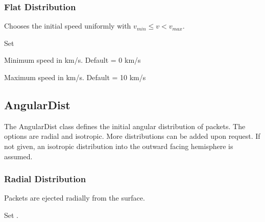 \documentclass[letterpaper,10pt,english]{sphinxmanual}
\begin{document}
\subsubsection{Flat Distribution}
\label{\detokenize{nexoclom2/inputfiles:flat-distribution}}\label{\detokenize{nexoclom2/inputfiles:flatspeeddist}}
\sphinxAtStartPar
Chooses the initial speed uniformly with \(v_{min} \leq v < v_{max}\).
\begin{description}
\sphinxAtStartPar
Set 

\sphinxAtStartPar
Minimum speed in km/s. Default = 0 km/s

\sphinxAtStartPar
Maximum speed in km/s. Default = 10 km/s

\end{description}


\subsection{AngularDist}
\label{\detokenize{nexoclom2/inputfiles:angulardist}}\label{\detokenize{nexoclom2/inputfiles:id7}}
\sphinxAtStartPar
The AngularDist class defines the initial angular distribution of packets.
The options are radial and isotropic. More distributions can be added upon
request. If not given, an isotropic distribution into the outward facing
hemisphere is assumed.


\subsubsection{Radial Distribution}
\label{\detokenize{nexoclom2/inputfiles:radial-distribution}}\label{\detokenize{nexoclom2/inputfiles:radialangulardist}}
\sphinxAtStartPar
Packets are ejected radially from the surface.
\begin{description}
\sphinxAtStartPar
Set .

\end{description}
\end{document}
